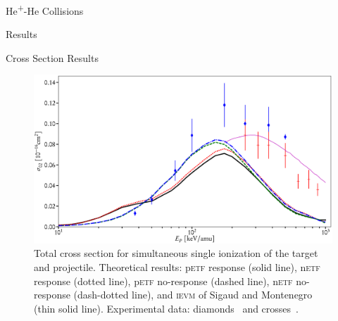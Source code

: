 \documentclass[a5paper, 9 pt]{extreport}
\begin{document}
\begin{chapter}{\texorpdfstring{He\textsuperscript{+}}{He+}-He Collisions \label{chap:hephe}}
\begin{section}{Results \label{sec:hephe-disc}}
\begin{subsection}{Cross Section Results \label{sec:hephe-res}}
         \begin{figure}[t]
            \centering
            \includegraphics[width = \linewidth]{./images/hephe-cross/HepHe-102.eps}
            \caption[Total cross section for simultaneous single ionization of the target and projectile
                     in He\textsuperscript{+}-He collisions.]
                    {Total cross section for simultaneous single ionization of the target and
                     projectile.
                     Theoretical results: p\textsc{etf} response (solid line), n\textsc{etf} response
                                          (dotted line), p\textsc{etf} no-response (dashed line),
                                          n\textsc{etf} no-response (dash-dotted line), and
                                          \textsc{ievm} of Sigaud and Montenegro~\cite{SM-03} (thin
                                          solid line).
                     Experimental data: diamonds~\cite{Dub-89} and crosses~\cite{SSMSM-11}.
                     \label{fig:cs102}}
         \end{figure}


\end{subsection}
\end{section}
\end{chapter}
\end{document}
